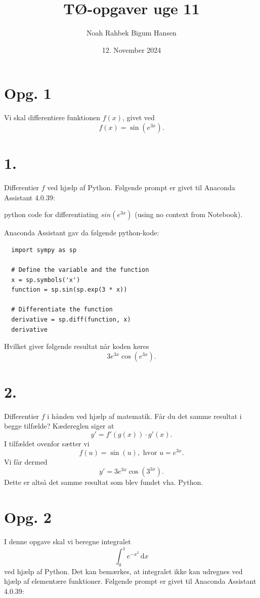 \documentclass[12pt]{article}
\title{TØ-opgaver uge 11}
\author{Noah Rahbek Bigum Hansen}
\date{12. November 2024}
\theoremstyle{definition}
\begin{document}
\maketitle

\section*{Opg. 1}
Vi skal differentiere funktionen $f(x)$, givet ved
\[ 
f(x) = \sin \left( e^{3x} \right)
.\]

\section*{1.}
Differentier $f$ ved hjælp af Python.
\bigbreak
Følgende prompt er givet til Anaconda Assistant 4.0.39: 

\begin{blueline}
  python code for differentiating $sin(e^{3x})$ (using no context from Notebook).
\end{blueline}

Anaconda Assistant gav da følgende python-kode:
\begin{verbatim}
  import sympy as sp

  # Define the variable and the function
  x = sp.symbols('x')
  function = sp.sin(sp.exp(3 * x))

  # Differentiate the function
  derivative = sp.diff(function, x)
  derivative
\end{verbatim}

Hvilket giver følgende resultat når koden køres
\[ 
3e^{3x}\cos \left( e^{3x} \right)
.\]


\section*{2.}
Differentier $f$ i hånden ved hjælp af matematik. Får du det samme resultat i begge tilfælde?
\bigbreak
Kædereglen siger at
\[ 
y' = f'(g(x)) \cdot g'(x) 
.\]
I tilfældet ovenfor sætter vi
\[ 
f(u) = \sin(u), \text{ hvor } u = e^{3x}
.\]
Vi får dermed
\[ 
y' = 3e^{3x}\cos(3^{3x})
.\]
Dette er altså det samme resultat som blev fundet vha. Python.



\section*{Opg. 2}
I denne opgave skal vi beregne integralet
\[ 
\int_{0}^{1} e^{-x^2} \, \mathrm{d}x 
\]
ved hjælp af Python. Det kan bemærkes, at integralet ikke kan udregnes ved hjælp af elementære funktioner.
\bigbreak
Følgende prompt er givet til Anaconda Assistant 4.0.39: 
\end{document}
